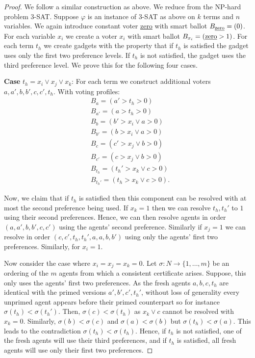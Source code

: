 \documentclass[11pt,a4paper, titlepage]{article}
\theoremstyle{definition}
\begin{document}
\begin{proof}
    We follow a similar construction as above. We reduce from the NP-hard problem \textsc{3-SAT}. Suppose $\varphi$ is an instance of \textsc{3-SAT} as above on $k$ terms and $n$ variables. We again introduce constant voter \underline{zero} with smart ballot $B_{\text{\underline{zero}}} = (0)$. For each variable $x_i$ we create a voter $x_i$ with smart ballot $B_{x_i} = (\text{\underline{zero}} > 1)$. For each term $t_h$ we create gadgets with the property that if $t_h$ is satisfied the gadget uses only the first two preference levels. If $t_h$ is not satisfied, the gadget uses the third preference level. We prove this for the following four cases.

    \textbf{Case} $t_h = x_i \lor x_j \lor x_k$:
    For each term we construct additional voters $a, a', b, b', c, c', t_h$. With voting profiles: 
    \begin{align*}
        &B_a = (a' > t_h > 0) \\
        &B_{a'} = (a > t_h > 0) \\
        &B_{b} = (b' > x_i \lor a > 0) \\
        &B_{b'} = (b > x_i \lor a > 0) \\
        &B_{c} = (c' > x_j \lor b > 0) \\
        &B_{c'} = (c > x_j \lor b > 0) \\
        &B_{t_h} = (t_h' > x_k \lor c > 0) \\
        &B_{t_h'} = (t_h > x_k \lor c > 0).
    \end{align*}

    Now, we claim that if $t_h$ is satisfied then this component can be resolved with at most the second preference being used. 
    If $x_k = 1$ then we can resolve $t_h, t_h'$ to $1$ using their second preferences. 
    Hence, we can then resolve agents in order $(a, a', b, b', c, c')$ using the agents' second preference. 
    Similarly if $x_j = 1$ we can resolve in order $(c, c', t_h, t_h', a, a, b, b')$ using only the agents' first two preferences. Similarly, for $x_i = 1$.

    Now consider the case where $x_i = x_j = x_k = 0$. Let $\sigma \colon N \longrightarrow \{1, \ldots, m\}$ be an ordering of the $m$ agents from which a consistent certificate arises. Suppose, this only uses the agents' first two preferences.
    As the fresh agents $a, b, c, t_h$ are identical with the primed versions $a', b', c', t_h'$, without loss of generality every unprimed agent appears before their primed counterpart so for instance $\sigma(t_h) < \sigma(t_h')$. 
    Then, $\sigma(c) < \sigma(t_h)$ as $x_k \lor c$ cannot be resolved with $x_k = 0$. 
    Similarly, $\sigma(b) < \sigma(c)$ and $ \sigma(a) < \sigma(b)$ but $\sigma(t_h) < \sigma(a)$. This leads to the contradiction $\sigma(t_h) < \sigma(t_h)$. 
    Hence, if $t_h$ is not satisfied, one of the fresh agents will use their third preferences, and if $t_h$ is satisfied, all fresh agents will use only their first two preferences.


\end{proof}
\end{document}
